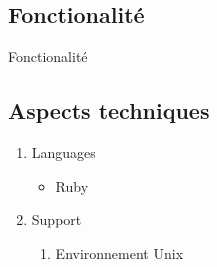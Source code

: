 \documentclass[12pt]{beamer}
\begin{document}
 \subsection{Fonctionalité}
    \begin{frame} {Fonctionalité}
     

        \end{frame}

\subsection{Aspects techniques}
    \begin{frame}
        \begin{enumerate}
            \item Languages
                \begin{itemize}
                    \item Ruby 
                \end{itemize}
            \item Support   
            \begin{enumerate}
                \item Environnement Unix
            \end{enumerate}
        \end{enumerate}
    \end{frame}
\end{document}
